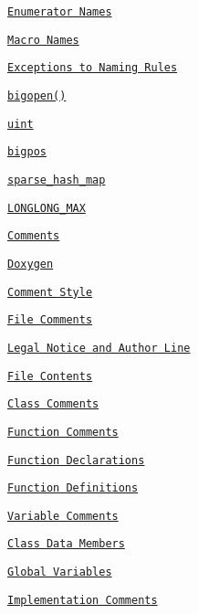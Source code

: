 \begin{DoxyItemize}
\begin{DoxyItemize}
\item \href{#enumerator-names}{\tt Enumerator Names}
\item \href{#macro-names}{\tt Macro Names}
\item \href{#exceptions-to-naming-rules}{\tt Exceptions to Naming Rules}
\begin{DoxyItemize}
\item \href{#bigopen}{\tt bigopen()}
\item \href{#uint}{\tt uint}
\item \href{#bigpos}{\tt bigpos}
\item \href{#sparse_hash_map}{\tt sparse\+\_\+hash\+\_\+map}
\item \href{#longlong_max}{\tt L\+O\+N\+G\+L\+O\+N\+G\+\_\+\+M\+AX}
\end{DoxyItemize}
\end{DoxyItemize}
\item \href{#comments}{\tt Comments}
\begin{DoxyItemize}
\item \href{#doxygen}{\tt Doxygen}
\item \href{#comment-style}{\tt Comment Style}
\item \href{#file-comments}{\tt File Comments}
\begin{DoxyItemize}
\item \href{#legal-notice-and-author-line}{\tt Legal Notice and Author Line}
\item \href{#file-contents}{\tt File Contents}
\end{DoxyItemize}
\item \href{#class-comments}{\tt Class Comments}
\item \href{#function-comments}{\tt Function Comments}
\begin{DoxyItemize}
\item \href{#function-declarations}{\tt Function Declarations}
\item \href{#function-definitions}{\tt Function Definitions}
\end{DoxyItemize}
\item \href{#variable-comments}{\tt Variable Comments}
\begin{DoxyItemize}
\item \href{#class-data-members-1}{\tt Class Data Members}
\item \href{#global-variables-1}{\tt Global Variables}
\end{DoxyItemize}
\item \href{#implementation-comments}{\tt Implementation Comments}

\end{DoxyItemize}
\end{DoxyItemize}
